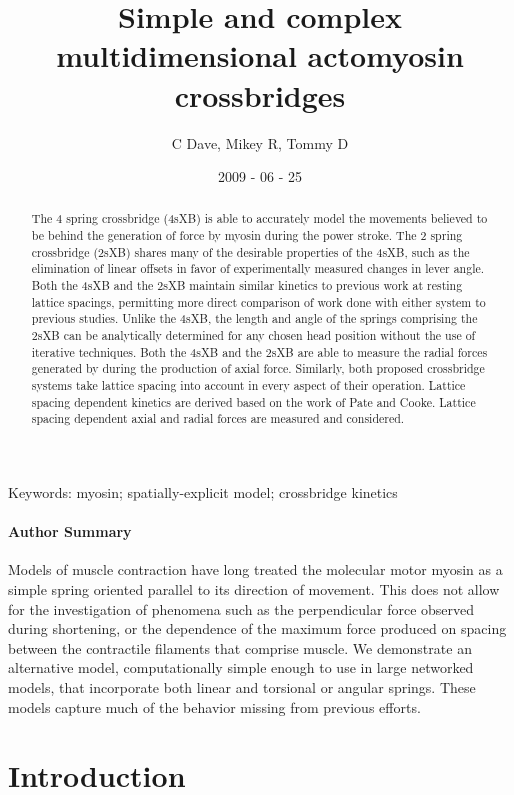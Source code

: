 \documentclass[]{article}
\title{Simple and complex multidimensional actomyosin crossbridges}
\author{C Dave, Mikey R, Tommy D}
\date{2009 - 06 - 25}
\begin{document}
\maketitle

\begin{abstract} 
The 4 spring crossbridge (4sXB) is able to accurately model the movements believed to be behind the generation of force by myosin during the power stroke.
The 2 spring crossbridge (2sXB) shares many of the desirable properties of the 4sXB, such as the elimination of linear offsets in favor of experimentally measured changes in lever angle.
Both the 4sXB and the 2sXB maintain similar kinetics to previous work at resting lattice spacings, permitting more direct comparison of work done with either system to previous studies.
Unlike the 4sXB, the length and angle of the springs comprising the 2sXB can be analytically determined for any chosen head position without the use of iterative techniques.
Both the 4sXB and the 2sXB are able to measure the radial forces generated by during the production of axial force.
Similarly, both proposed crossbridge systems take lattice spacing into account in every aspect of their operation.
Lattice spacing dependent kinetics are derived based on the work of Pate and Cooke.
Lattice spacing dependent axial and radial forces are measured and considered.
\end{abstract}

Keywords: myosin; spatially-explicit model; crossbridge kinetics

\paragraph*{Author Summary} %
Models of muscle contraction have long treated the molecular motor myosin as a simple spring oriented parallel to its direction of movement. 
This does not allow for the investigation of phenomena such as the perpendicular force observed during shortening, or the dependence of the maximum force produced on spacing between the contractile filaments that comprise muscle.
We demonstrate an alternative model, computationally simple enough to use in large networked models, that incorporate both linear and torsional or angular springs. These models capture much of the behavior missing from previous efforts.

\section{Introduction} %
\end{document}
